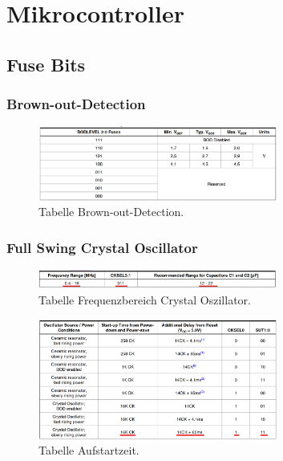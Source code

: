 \section{Mikrocontroller}\label{Appendix:Mikrocontroller}

\subsection{Fuse Bits}

\subsubsection{Brown-out-Detection}\label{Appendix:Brown-out-Detection}

\begin{figure}[H]
	\centering
	\includegraphics[width=0.7\textwidth]{graphics/Tabelle_BoD}
	\caption{Tabelle Brown-out-Detection.}
	\label{fig:Tabelle_BoD}
\end{figure}


\subsubsection{Full Swing Crystal Oscillator}\label{Appendix:Full_Swing _Crystal_Oscillator}

\begin{figure}[H]
	\centering
	\includegraphics[width=0.7\textwidth]{graphics/Tabelle_Crystal}
	\caption{Tabelle Frequenzbereich Crystal Oszillator.}
	\label{fig:Tabelle_Crystal}
\end{figure}


\begin{figure}[H]
	\centering
	\includegraphics[width=0.7\textwidth]{graphics/Tabelle_Crystal2}
	\caption{Tabelle Aufstartzeit.}
	\label{fig:Tabelle_Crystal2}
\end{figure}

